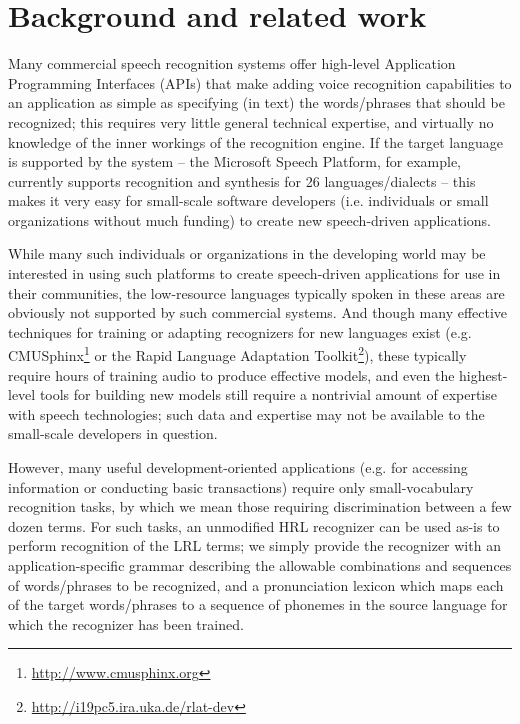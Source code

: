 \documentclass[11pt]{article}
\begin{document}
\section{Background and related work}
\label{sec:background}
Many commercial speech recognition systems offer high-level Application Programming Interfaces (APIs) that make adding voice recognition capabilities to an application as simple as specifying (in text) the words/phrases that should be recognized; this requires very little general technical expertise, and virtually no knowledge of the inner workings of the recognition engine. If the target language is supported by the system -- the Microsoft Speech Platform, for example, currently supports recognition and synthesis for 26 languages/dialects \cite{mspsdk} -- this makes it very easy for small-scale software developers (i.e. individuals or small organizations without much funding) to create new speech-driven applications. 

While many such individuals or organizations in the developing world may be interested in using such platforms to create speech-driven applications for use in their communities, the low-resource languages typically spoken in these areas are obviously not supported by such commercial systems. 
And though many effective techniques for training or adapting recognizers for new languages exist (e.g. CMUSphinx\footnote{\url{http://www.cmusphinx.org}} or the Rapid Language Adaptation Toolkit\footnote{\url{http://i19pc5.ira.uka.de/rlat-dev}}), these typically require hours of training audio to produce effective models, and even the highest-level tools for building new models still require a nontrivial amount of expertise with speech technologies; such data and expertise may not be available to the small-scale developers in question.

However, many useful development-oriented applications (e.g. for accessing information or conducting basic transactions) require only small-vocabulary recognition tasks, by which we mean those requiring discrimination between a few dozen terms.
For such tasks, an unmodified HRL recognizer can be used as-is to perform recognition of the LRL terms; 
we simply provide the recognizer with an application-specific grammar describing the allowable combinations and sequences of words/phrases to be recognized, and a pronunciation lexicon which maps each of the target words/phrases to a sequence of phonemes in the source language for which the recognizer has been trained. 
\end{document}
